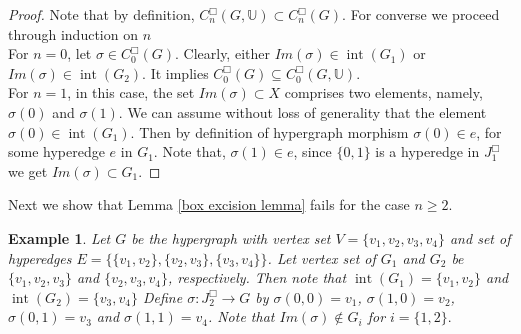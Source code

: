 \documentclass[10pt,a4paper]{amsart}
\newtheorem{ex}[subsection]{Example}
\renewcommand{\int}{\operatorname{int}}
\begin{document}
\begin{proof} Note that by definition, $C_n^\Box(G,\mathbb{U}) \subset C_n^\Box(G)$. For converse we proceed through induction on $n$\\


For $n=0$, let $\sigma \in  C_0^\Box(G)$. Clearly, either $Im(\sigma) \in \int(G_1)$ or $Im(\sigma) \in \int(G_2)$. It implies $C_0^\Box(G)\subseteq C_0^\Box(G,\mathbb{U})$.\\


For $n=1$, in this case, the set $Im(\sigma) \subset X$ comprises two elements, namely, $\sigma(0)$ and $\sigma(1)$. We can assume without loss of generality that the element $\sigma(0) \in \int(G_1)$. Then by definition of hypergraph morphism $\sigma(0)\in e$, for some hyperedge $e$ in $G_1.$ Note that, $\sigma(1)\in e$, since $\{0,1\}$ is a hyperedge in $J_1^\Box$ we get $Im(\sigma) \subset G_1$.
\end{proof}

Next we show that Lemma \ref{box excision lemma} fails for the case $n\ge 2$.

\begin{ex}
Let $G$ be the hypergraph with vertex set $V=\{v_1,v_2,v_3,v_4\}$ and set of hyperedges $E=\{\{v_1,v_2\} , \{v_2,v_3\}, \{v_3,v_4\}\}$. Let vertex set of $G_1$ and $G_2$ be $\{v_1,v_2,v_3\} $ and $ \{v_2,v_3,v_4\} $, respectively. Then note that $\int(G_1)=\{v_1,v_2\}$ and $\int(G_2)=\{v_3,v_4\}$ Define $\sigma: J_2^\Box \rightarrow G$ by $\sigma(0,0)=v_1$, $\sigma(1,0)=v_2$,  $\sigma(0,1)=v_3$ and $\sigma(1,1)=v_4$. Note that $Im(\sigma)\notin G_i$ for $i=\{1,2\}.$
\end{ex}
\end{document}
